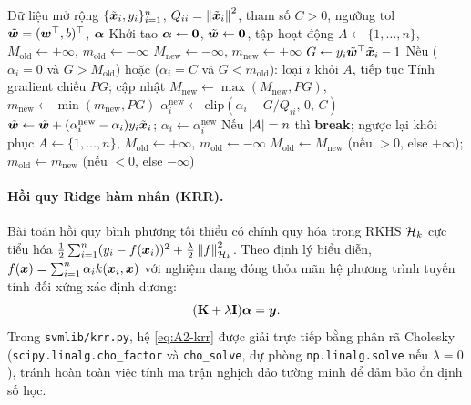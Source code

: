 \begin{algorithm}[!htbp]
\caption{Hạ tọa độ đối ngẫu có thu gọn tập hoạt động (DCD)}\label{alg:A2-dcd}
\begin{algorithmic}[1]
\Require Dữ liệu mở rộng $\{\tilde{\bm{x}}_i, y_i\}_{i=1}^n$, $Q_{ii} = \left\lVert \tilde{\bm{x}}_i \right\rVert^2$, tham số $C > 0$, ngưỡng $\mathrm{tol}$
\Ensure $\tilde{\bm{w}} = (\bm{w}^{\top}, b)^{\top}$, $\bm{\alpha}$
\State Khởi tạo $\bm{\alpha} \leftarrow \bm{0}$, $\tilde{\bm{w}} \leftarrow \bm{0}$, tập hoạt động $A \leftarrow \{1, \dots, n\}$, $M_{\text{old}} \leftarrow +\infty$, $m_{\text{old}} \leftarrow -\infty$
  \State $M_{\text{new}} \leftarrow -\infty$, \; $m_{\text{new}} \leftarrow +\infty$
    \State $G \leftarrow y_i \tilde{\bm{w}}^{\top} \tilde{\bm{x}}_i - 1$
    \State Nếu ($\alpha_i = 0$ và $G > M_{\text{old}}$) hoặc ($\alpha_i = C$ và $G < m_{\text{old}}$): loại $i$ khỏi $A$, tiếp tục
    \State Tính gradient chiếu $PG$; cập nhật $M_{\text{new}} \leftarrow \max(M_{\text{new}}, PG)$, $m_{\text{new}} \leftarrow \min(m_{\text{new}}, PG)$
      \State $\alpha_i^{\text{new}} \leftarrow \mathrm{clip}(\alpha_i - G/Q_{ii},\, 0,\, C)$
      \State $\tilde{\bm{w}} \leftarrow \tilde{\bm{w}} + (\alpha_i^{\text{new}} - \alpha_i) y_i \tilde{\bm{x}}_i$; \; $\alpha_i \leftarrow \alpha_i^{\text{new}}$
    \EndIf
  \EndFor
    \State Nếu $\left\lvert A \right\rvert = n$ thì \textbf{break}; ngược lại khôi phục $A \leftarrow \{1, \dots, n\}$, $M_{\text{old}} \leftarrow +\infty$, $m_{\text{old}} \leftarrow -\infty$
  \Else
    \State $M_{\text{old}} \leftarrow M_{\text{new}}$ (nếu $>0$, else $+\infty$); \; $m_{\text{old}} \leftarrow m_{\text{new}}$ (nếu $<0$, else $-\infty$)
  \EndIf
\EndFor
\end{algorithmic}
\end{algorithm}

\paragraph{Hồi quy Ridge hàm nhân (KRR).}
Bài toán hồi quy bình phương tối thiểu có chính quy hóa trong RKHS $\mathcal{H}_k$ cực tiểu hóa $\frac{1}{2}\sum_{i=1}^n (y_i - f(\bm{x}_i))^2 + \frac{\lambda}{2}\left\lVert f \right\rVert_{\mathcal{H}_k}^2$. Theo định lý biểu diễn, $f(\bm{x}) = \sum_{i=1}^n \alpha_i k(\bm{x}_i, \bm{x})$ với nghiệm dạng đóng thỏa mãn hệ phương trình tuyến tính đối xứng xác định dương:
\begin{equation}\label{eq:A2-krr}
  (\mathbf{K} + \lambda \mathbf{I})\bm{\alpha} = \bm{y}.
\end{equation}
Trong \texttt{svmlib/krr.py}, hệ \eqref{eq:A2-krr} được giải trực tiếp bằng phân rã Cholesky (\texttt{scipy.linalg.\allowbreak cho\_factor} và \texttt{cho\_solve}, dự phòng \texttt{np.linalg.\allowbreak solve} nếu $\lambda = 0$), tránh hoàn toàn việc tính ma trận nghịch đảo tường minh để đảm bảo ổn định số học.

